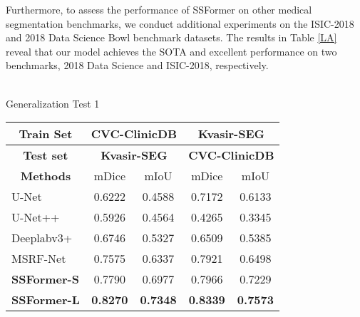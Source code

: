 \documentclass[runningheads]{llncs}
\begin{document}
Furthermore, to assess the performance of SSFormer on other medical segmentation benchmarks, we conduct additional experiments on the ISIC-2018 and 2018 Data Science Bowl benchmark datasets. The results in Table \ref{LA} reveal that our model achieves the SOTA and excellent performance on two benchmarks, 2018 Data Science and ISIC-2018, respectively.
 ~\\~\\
\begin{minipage}{\textwidth}\scriptsize
\renewcommand\arraystretch{1.2}
        \begin{minipage}[t]{0.49\textwidth}
            \centering
            \makeatletter{}\makeatother\caption{Generalization Test 1}
            \label{GT1}
            \begin{tabular}{|l|cc|cc|}
            \hline
\multicolumn{1}{|c|}{\textbf{Train Set}} & \multicolumn{2}{c|}{\textbf{CVC-ClinicDB}}               & \multicolumn{2}{c|}{\textbf{Kvasir-SEG}}             \\
\hline
\multicolumn{1}{|c|}{\textbf{Test set}} & \multicolumn{2}{c|}{\textbf{Kvasir-SEG}}               & \multicolumn{2}{c|}{\textbf{CVC-ClinicDB}}             \\ \hline
\multicolumn{1}{|c|}{\textbf{Methods}} & \multicolumn{1}{c|}{mDice}           & mIoU            & \multicolumn{1}{c|}{mDice}           & mIoU            \\ \hline
U-Net                                  & \multicolumn{1}{c|}{0.6222}          & 0.4588          & \multicolumn{1}{c|}{0.7172}          & 0.6133          \\ \hline
U-Net++                                & \multicolumn{1}{c|}{0.5926}          & 0.4564          & \multicolumn{1}{c|}{0.4265}          & 0.3345          \\ \hline
Deeplabv3+                             & \multicolumn{1}{c|}{0.6746}          & 0.5327          & \multicolumn{1}{c|}{0.6509}          & 0.5385          \\ \hline
MSRF-Net                               & \multicolumn{1}{c|}{0.7575}          & 0.6337          & \multicolumn{1}{c|}{0.7921}          & 0.6498          \\ \hline
\textbf{SSFormer-S}                    & \multicolumn{1}{c|}{0.7790}          & 0.6977          & \multicolumn{1}{c|}{0.7966}          & 0.7229          \\ \hline
\textbf{SSFormer-L}                    & \multicolumn{1}{c|}{\textbf{0.8270}} & \textbf{0.7348} & \multicolumn{1}{c|}{\textbf{0.8339}} & \textbf{0.7573} \\ \hline

\end{tabular}
\end{minipage}
\end{minipage}
\end{document}
